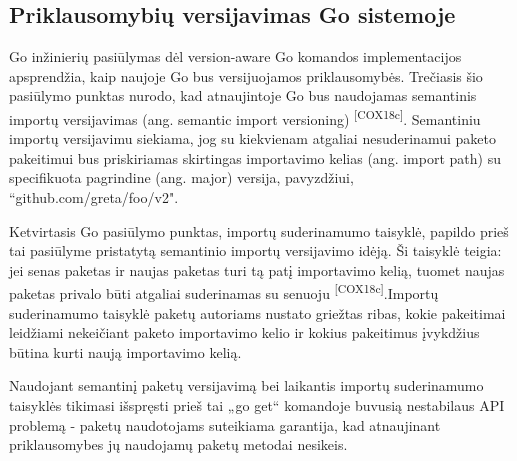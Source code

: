 \subsection{Priklausomybių versijavimas Go sistemoje}

Go inžinierių pasiūlymas dėl version-aware Go komandos implementacijos apsprendžia, kaip naujoje
Go bus versijuojamos priklausomybės. Trečiasis šio pasiūlymo punktas nurodo, kad atnaujintoje Go bus
naudojamas semantinis importų versijavimas (ang. semantic import versioning) \textsuperscript{[COX18c]}.
Semantiniu importų versijavimu siekiama, jog su kiekvienam atgaliai nesuderinamui paketo pakeitimui bus priskiriamas
skirtingas importavimo kelias (ang. import path) su specifikuota pagrindine (ang. major) versija, pavyzdžiui, “github.com/greta/foo/v2".


Ketvirtasis Go pasiūlymo punktas, importų suderinamumo taisyklė, papildo prieš
tai pasiūlyme pristatytą semantinio importų versijavimo idėją. Ši taisyklė teigia: jei
senas paketas ir naujas paketas turi tą patį importavimo kelią, tuomet naujas paketas privalo būti atgaliai
suderinamas su senuoju \textsuperscript{[COX18c]}.Importų suderinamumo taisyklė paketų autoriams nustato griežtas ribas, kokie pakeitimai leidžiami
nekeičiant paketo importavimo kelio ir kokius pakeitimus įvykdžius būtina kurti naują importavimo kelią.

Naudojant semantinį paketų versijavimą bei laikantis importų suderinamumo taisyklės tikimasi išspręsti prieš tai „go get“
komandoje buvusią nestabilaus API problemą - paketų naudotojams suteikiama garantija,
kad atnaujinant priklausomybes jų naudojamų paketų metodai nesikeis.
